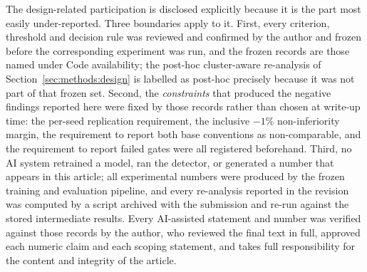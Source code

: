\documentclass[pdflatex,sn-mathphys-num]{sn-jnl}
\theoremstyle{thmstyleone}%
\theoremstyle{thmstyletwo}%
\theoremstyle{thmstylethree}%
\begin{document}
The design-related participation is disclosed explicitly because it is the part most easily under-reported. Three boundaries apply to it. First, every criterion, threshold and decision rule was reviewed and confirmed by the author and frozen before the corresponding experiment was run, and the frozen records are those named under Code availability; the post-hoc cluster-aware re-analysis of Section~\ref{sec:methods:design} is labelled as post-hoc precisely because it was not part of that frozen set. Second, the \emph{constraints} that produced the negative findings reported here were fixed by those records rather than chosen at write-up time: the per-seed replication requirement, the inclusive $-1\%$ non-inferiority margin, the requirement to report both base conventions as non-comparable, and the requirement to report failed gates were all registered beforehand. Third, no AI system retrained a model, ran the detector, or generated a number that appears in this article; all experimental numbers were produced by the frozen training and evaluation pipeline, and every re-analysis reported in the revision was computed by a script archived with the submission and re-run against the stored intermediate results. Every AI-assisted statement and number was verified against those records by the author, who reviewed the final text in full, approved each numeric claim and each scoping statement, and takes full responsibility for the content and integrity of the article.


\end{document}
